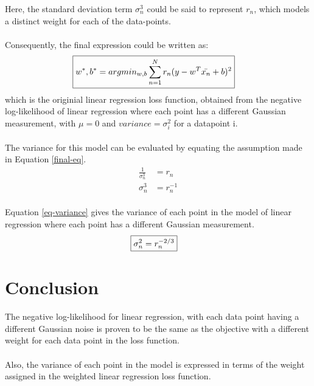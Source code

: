 \documentclass[a4paper]{article}
\begin{document}
Here, the standard deviation term $\sigma_n^3$ could be said to represent $r_n$, which models a distinct weight for each of the data-points.
\\
\\
Consequently, the final expression could be written as:\\
\begin{align}
\label{final-eq}
	\Aboxed{w^*, b^* &= argmin_{w,b} \sum_{n=1}^{N} r_n (y - w^T\bar{x_n} + b)^2}
\end{align}
which is the originial linear regression loss function, obtained from the negative log-likelihood of linear regression where each point has a different Gaussian measurement, with $\mu = 0$ and $variance = \sigma_i^2$ for a datapoint i.
\\
\\
The variance for this model can be evaluated by equating the assumption made in Equation \ref{final-eq}.
\begin{align*}
	\frac{1}{\sigma_n^3} &= r_n\\
	\sigma_n^3 &= r_n^{-1}
\end{align*}
\\
Equation \ref{eq-variance} gives the variance of each point in the model of linear regression where each point has a different Gaussian measurement.
\begin{align}
\label{eq-variance}
	\Aboxed{\sigma_n^2 &= r_n^{-2/3}}
\end{align}


\section{Conclusion}
The negative log-likelihood for linear regression, with each data point having a different Gaussian noise is proven to be the same as the objective with a different weight for each data point in the loss function.\\
\\
Also, the variance of each point in the model is expressed in terms of the weight assigned in the weighted linear regression loss function.
\end{document}
